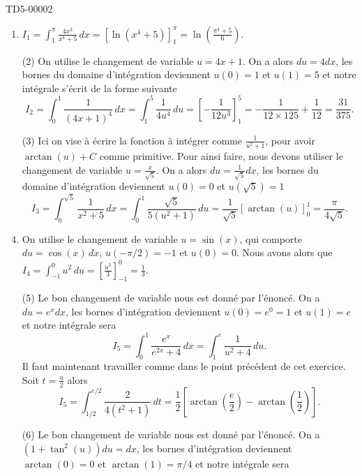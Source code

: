 
\begin{corrige}{TD5-00002}
  \begin{enumerate}
 \item $I_{1}=\displaystyle \int_{1}^{\pi} \frac{4x^3}{x^4+5}\, dx = \left[\ln(x^4+5)\right]_1^\pi = \ln\left(\frac{\pi^4+5}{6}\right)$.
  \item[(2)] On utilise le changement de variable $u =4x+1 $. On a alors $du = 4 dx$, les bornes du domaine d'intégration deviennent $u(0) = 1$ et $u(1) =5$ et notre intégrale s'écrit de la forme suivante
    \[
    I_{2}=\int_{0}^{1}\frac{1}{(4x+1)^4}\, dx =\int_{1}^{5}\frac{1}{4u^4}\, du = \left[-\frac{1}{12u^3}\right]_1^5 = -\frac{1}{12\times 125} + \frac{1}{12} = \frac{31}{375}.
    \]
  \item[(3)] Ici on vise à écrire la fonction à intégrer comme $\frac{1}{u^2 + 1}$, pour avoir $\arctan(u) + C$ comme primitive. Pour ainsi faire, nous devons utiliser le changement de variable $u= \frac{x}{\sqrt{5}}$. On a alors $du = \frac{1}{\sqrt{5}} dx$, les bornes du domaine d'intégration deviennent $u(0) = 0$ et $u(\sqrt{5}) =1$ 
    \[
    I_{3}=\int_{0}^{\sqrt{5}}\frac{1}{x^2+5}\, dx = \int_{0}^{1}\frac{\sqrt{5}}{5(u^2+1)}\, du = \frac{1}{\sqrt{5}} [\arctan(u)]_0^1 = \frac{\pi}{4\sqrt{5}}.
    \]
  \item On utilise le changement de variable $u = \sin(x)$, qui comporte $du = \cos(x)\,dx$,  $u(-\pi/2) = -1$ et  $u(0) = 0$. Nous avons alors que  $I_{4}=\displaystyle \int_{-1}^{0} u^2\, du = \left[\frac{u^3}{3}\right]_{-1}^0= \frac{1}{3}$.
  \item[(5)] Le bon changement de variable nous est donné par l'énoncé. On a $du= e^x dx$, les bornes d'intégration deviennent $u(0) = e^0=1$ et $u(1) = e$ et notre intégrale sera 
    \[
    I_{5}=\int_{0}^{1}\frac{e^x}{e^{2x}+4} \, dx =\int_{1}^{e}\frac{1}{u^2+4} \, du. 
    \] 
    Il faut maintenant travailler comme dans le point précédent de cet exercice. Soit $t =\frac{u}{2}$ alors 
    \[
    I_{5}=\int_{1/2}^{e/2}\frac{2}{4(t^2+1)} \, dt = \frac{1}{2} \left[\arctan\left(\frac{e}{2}\right) - \arctan\left(\frac{1}{2}\right)\right].  
    \] 
 \item[(6)] Le bon changement de variable nous est donné par l'énoncé. On a $ (1 + \tan^2(u))du= dx$, les bornes d'intégration deviennent $\arctan(0) = 0$ et $\arctan(1) = \pi/4$ et notre intégrale sera 

\end{enumerate}
\end{corrige}
